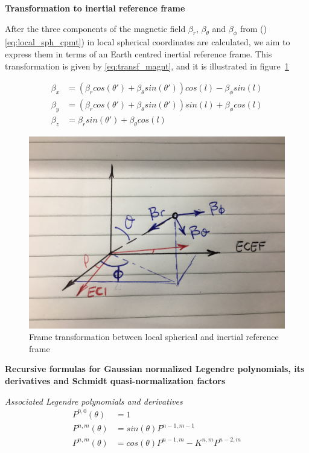 \textbf{Transformation to inertial reference frame}

After the three components of the magnetic field $\beta_r$, $\beta_{\theta}$ and $\beta_{\phi}$ from ()\ref{eq:local_sph_cpmt}) in local spherical coordinates are calculated, we aim to express them in terms of an Earth centred inertial reference frame. This transformation is given by \ref{eq:transf_magnt}, and it is illustrated in figure~\ref{fig:transf_magnt}

\begin{equation}
\begin{aligned} \label{eq:transf_magnt}
\beta_x &= \left(\beta_r cos(\theta') +  \beta_{\theta}sin(\theta')\right)cos(l) - \beta_{\phi}sin(l)\\
\beta_y &= \left(\beta_r cos(\theta') +  \beta_{\theta}sin(\theta')\right)sin(l) + \beta_{\phi}cos(l)\\
\beta_z &= \beta_r sin(\theta') + \beta_{\theta} cos(l)
\end{aligned}
\end{equation}

\begin{figure} \label{fig:transf_magnt}
	\centering
	\includegraphics[width=0.4\textheight]{frame_transformation_magnetic_tmp.jpeg}
	\caption{Frame transformation between local spherical and inertial reference frame}
\end{figure}

{\bf Recursive formulas for Gaussian normalized Legendre polynomials, its derivatives and Schmidt quasi-normalization factors}

{\it Associated Legendre polynomials and derivatives}
\begin{equation} \label{eq:Legendre_Recursive}
\begin{aligned}
P^{0,0}(\theta) &= 1\\
P^{n,m}(\theta) &= sin(\theta)P^{n-1,m-1}\\
P^{n,m}(\theta) &= cos(\theta)P^{n-1,m} - K^{n,m}P^{n-2,m}
\end{aligned}
\end{equation}

